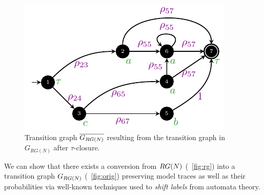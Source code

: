 \begin{figure}[!t]
\begin{minipage}{.49\textwidth}
\end{minipage}\hfill \begin{minipage}{.49\textwidth}\centering \includegraphics[width=.7\textwidth]{images/closed_example.pdf}
	\caption{Transition graph $\overline{G_{RG(N)}}$ resulting from the transition graph in $G_{RG(N)}$ after $\tau$-closure.}\label{fig:closed}
\end{minipage}
\end{figure}




%
%

We can show that there exists a conversion from $RG(N)$ (\figurename~\ref{fig:rg}) into a transition graph $G_{RG(N)}$ (\figurename~\ref{fig:orig}) preserving model traces as well as their probabilities via well-known techniques used to \emph{shift labels} from automata theory.
\medskip


